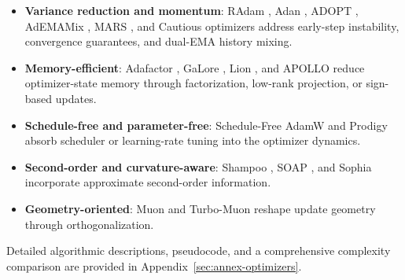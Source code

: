 \begin{itemize}[leftmargin=*]
    \item \textbf{Variance reduction and momentum}: RAdam \citep{liu_variance_2019}, Adan \citep{xie_adan_2022}, ADOPT \citep{taniguchi_adopt_2024}, AdEMAMix \citep{pagliardini_ademamix_2024}, MARS \citep{yuan_mars_2024}, and Cautious optimizers \citep{liang_cautious_2024} address early-step instability, convergence guarantees, and dual-EMA history mixing.
    \item \textbf{Memory-efficient}: Adafactor \citep{shazeer_adafactor_2018}, GaLore \citep{zhao_galore_2024}, Lion \citep{chen_symbolic_2023}, and APOLLO \citep{zhu2025apollosgdlikememoryadamwlevel} reduce optimizer-state memory through factorization, low-rank projection, or sign-based updates.
    \item \textbf{Schedule-free and parameter-free}: Schedule-Free AdamW \citep{defazio_road_2024} and Prodigy \citep{mishchenko_prodigy_2023} absorb scheduler or learning-rate tuning into the optimizer dynamics.
    \item \textbf{Second-order and curvature-aware}: Shampoo \citep{gupta_shampoo_2018}, SOAP \citep{vyas_soap_2024}, and Sophia \citep{liu_sophia_2023} incorporate approximate second-order information.
    \item \textbf{Geometry-oriented}: Muon \citep{shen_convergence_2025} and Turbo-Muon \citep{boissin_turbo-muon_2025} reshape update geometry through orthogonalization.
\end{itemize}

Detailed algorithmic descriptions, pseudocode, and a comprehensive complexity comparison are provided in Appendix~\ref{sec:annex-optimizers}.

